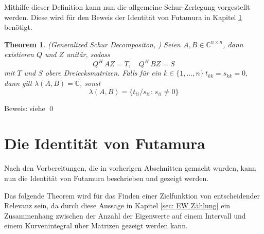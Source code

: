 \documentclass[a4paper,12pt]{report}
\newcommand{\C}{\mathbb C}
\newcommand{\1}{\mathds{1}}
\theoremstyle{plain} %
\newtheorem{theorem}{Theorem}
\theoremstyle{definition} %
\theoremstyle{remark}
\begin{document}
            Mithilfe dieser Definition kann nun die allgemeine Schur-Zerlegung vorgestellt werden.
            Diese wird für den Beweis der Identität von Futamura in Kapitel \ref{sec: Futamura} benötigt.
            \begin{theorem}(Generalized Schur Decompositon, \cite[S. 377]{matrixGolub})
                  \label{thrm: allg Schur Zerlegung}
                  Seien $A, B \in \C^{n\times n}$, dann existieren $Q$ und $Z$ unitär, sodass
                  \begin{equation}
                        \label{eqn: allg Schur_Resultat}
                        Q^H\,AZ = T,\quad Q^H\, BZ = S
                  \end{equation}
                  mit $T$ und $S$ obere Dreiecksmatrizen.
                  Falls für ein $k\in \{1,\dots, n\}\ t_{kk}=s_{kk}=0$, dann gilt $\lambda(A, B) = \C$, sonst
                  \begin{equation}
                        \label{eqn: EW Pencil nach Schur}
                        \lambda(A, B) = \{t_{ii}/s_{ii}:\, s_{ii}\ne 0\}
                  \end{equation}
            \end{theorem}
            Beweis: siehe \cite[S. 377]{matrixGolub}\qed
      
      \section{Die Identität von Futamura}
      \label{sec: Futamura}

            Nach den Vorbereitungen, die in vorherigen Abschnitten gemacht wurden, kann nun die Identität von Futamura beschrieben und gezeigt werden.

            Das folgende Theorem wird für das Finden einer Zielfunktion von entscheidender Relevanz sein,
            da durch diese Aussage in Kapitel \ref{sec: EW Zählung} ein Zusammenhang zwischen der Anzahl der Eigenwerte auf einem Intervall und einem Kurvenintegral über Matrizen gezeigt werden kann.
\end{document}
